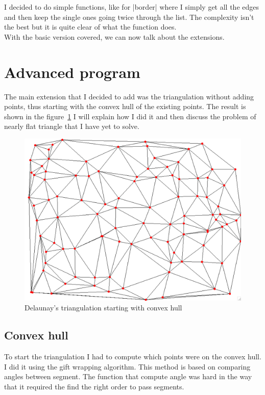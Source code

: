 \documentclass[a4paper,11pt]{article}%
\begin{document}
I decided to do simple functions, like for |border| where I simply get all the edges and then keep the single ones going twice through the list. The complexity isn't the best but it is quite clear of what the function does. \\


With the basic version covered, we can now talk about the extensions.



\section{Advanced program}

The main extension that I decided to add was the triangulation without adding points, thus starting with the convex hull of the existing points. The result is shown in the figure~\ref{fig:good} I will explain how I did it and then discuss the problem of nearly flat triangle that I have yet to solve.

\begin{figure}[H]
	\begin{center}
		\includegraphics[scale=0.3]{convexhull-good.png}
	\end{center}
	\caption{Delaunay's triangulation starting with convex hull}
	\label{fig:good}
\end{figure}

\subsection{Convex hull}
To start the triangulation I had to compute which points were on the convex hull. I did it using the gift wrapping algorithm. This method is based on comparing angles between segment. The function that compute angle was hard in the way that it required the find the right order to pass segments.
\end{document}

